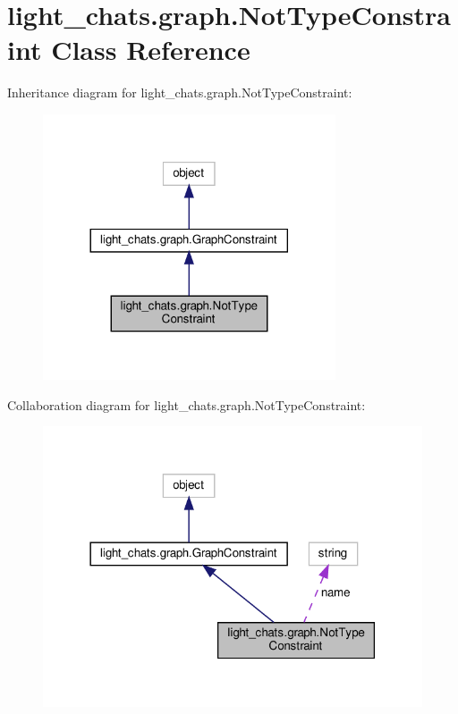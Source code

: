 \hypertarget{classlight__chats_1_1graph_1_1NotTypeConstraint}{}\section{light\+\_\+chats.\+graph.\+Not\+Type\+Constraint Class Reference}
\label{classlight__chats_1_1graph_1_1NotTypeConstraint}


Inheritance diagram for light\+\_\+chats.\+graph.\+Not\+Type\+Constraint\+:
\nopagebreak
\begin{figure}[H]
\begin{center}
\leavevmode
\includegraphics[width=245pt]{classlight__chats_1_1graph_1_1NotTypeConstraint__inherit__graph}
\end{center}
\end{figure}


Collaboration diagram for light\+\_\+chats.\+graph.\+Not\+Type\+Constraint\+:
\nopagebreak
\begin{figure}[H]
\begin{center}
\leavevmode
\includegraphics[width=318pt]{classlight__chats_1_1graph_1_1NotTypeConstraint__coll__graph}
\end{center}
\end{figure}

